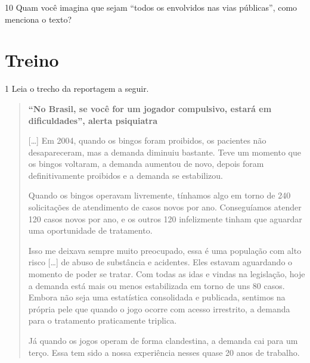 \num{10} Quam você imagina que sejam ``todos os envolvidos nas vias
públicas'', como menciona o texto?


\section{Treino}


\num{1} Leia o trecho da reportagem a seguir.

\begin{quote}
\textbf{``No Brasil, se você for um jogador compulsivo, estará em dificuldades'', alerta psiquiatra}


{[}\ldots{}{]} Em 2004, quando os bingos foram proibidos, os pacientes
não desapareceram, mas a demanda diminuiu bastante. Teve um momento que
os bingos voltaram, a demanda aumentou de novo, depois foram
definitivamente proibidos e a demanda se estabilizou.

Quando os bingos operavam livremente, tínhamos algo em torno de 240
solicitações de atendimento de casos novos por ano. Conseguíamos atender
120 casos novos por ano, e os outros 120 infelizmente tinham que
aguardar uma oportunidade de tratamento.

Isso me deixava sempre muito preocupado, essa é uma população com alto
risco {[}\ldots{}{]} de abuso de substância e acidentes. Eles estavam
aguardando o momento de poder se tratar. Com todas as idas e vindas na
legislação, hoje a demanda está mais ou menos estabilizada em torno de
uns 80 casos. Embora não seja uma estatística consolidada e publicada,
sentimos na própria pele que quando o jogo ocorre com acesso irrestrito,
a demanda para o tratamento praticamente triplica.

Já quando os jogos operam de forma clandestina, a demanda cai para um
terço. Essa tem sido a nossa experiência nesses quase 20 anos de
trabalho.

\end{quote}

